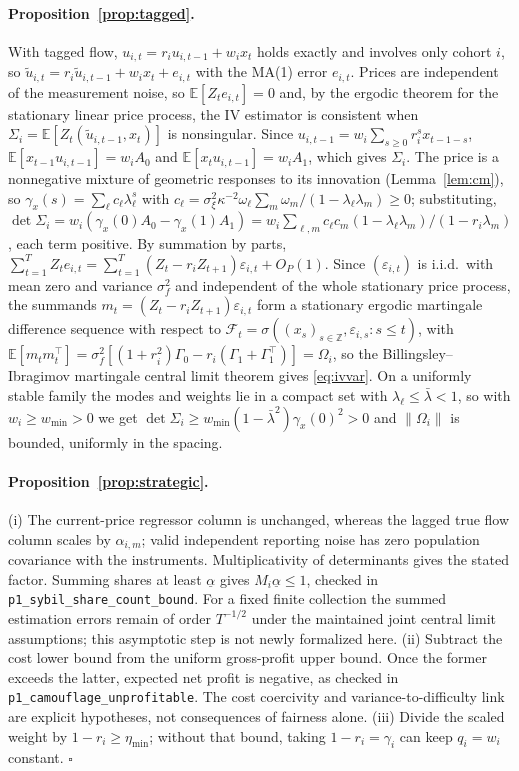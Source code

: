 \documentclass[12pt]{article}
\theoremstyle{definition}
\theoremstyle{remark}
\newcommand{\E}{\mathbb{E}}
\begin{document}
\paragraph{Proposition~\ref{prop:tagged}.} With tagged flow, $u_{i,t}=r_iu_{i,t-1}+w_ix_t$ holds exactly and involves only cohort $i$, so $\tilde u_{i,t}=r_i\tilde u_{i,t-1}+w_ix_t+e_{i,t}$ with the MA(1) error $e_{i,t}$. Prices are independent of the measurement noise, so $\E[Z_te_{i,t}]=0$ and, by the ergodic theorem for the stationary linear price process, the IV estimator is consistent when $\Sigma_i=\E[Z_t(\tilde u_{i,t-1},x_t)]$ is nonsingular. Since $u_{i,t-1}=w_i\sum_{s\ge0}r_i^sx_{t-1-s}$, $\E[x_{t-1}u_{i,t-1}]=w_iA_0$ and $\E[x_tu_{i,t-1}]=w_iA_1$, which gives $\Sigma_i$. The price is a nonnegative mixture of geometric responses to its innovation (Lemma~\ref{lem:cm}), so $\gamma_x(s)=\sum_\ell c_\ell\lambda_\ell^{s}$ with $c_\ell=\sigma_\xi^2\kappa^{-2}\omega_\ell\sum_m\omega_m/(1-\lambda_\ell\lambda_m)\ge0$; substituting, $\det\Sigma_i=w_i(\gamma_x(0)A_0-\gamma_x(1)A_1)=w_i\sum_{\ell,m}c_\ell c_m(1-\lambda_\ell\lambda_m)/(1-r_i\lambda_m)$, each term positive. By summation by parts, $\sum_{t=1}^TZ_te_{i,t}=\sum_{t=1}^T(Z_t-r_iZ_{t+1})\varepsilon_{i,t}+O_P(1)$. Since $(\varepsilon_{i,t})$ is i.i.d.\ with mean zero and variance $\sigma_f^2$ and independent of the whole stationary price process, the summands $m_t=(Z_t-r_iZ_{t+1})\varepsilon_{i,t}$ form a stationary ergodic martingale difference sequence with respect to $\mathcal F_t=\sigma((x_s)_{s\in\mathbb Z},\varepsilon_{i,s}:s\le t)$, with $\E[m_tm_t^\top]=\sigma_f^2[(1+r_i^2)\Gamma_0-r_i(\Gamma_1+\Gamma_1^\top)]=\Omega_i$, so the Billingsley--Ibragimov martingale central limit theorem gives \eqref{eq:ivvar}. On a uniformly stable family the modes and weights lie in a compact set with $\lambda_\ell\le\bar\lambda<1$, so with $w_i\ge w_{\min}>0$ we get $\det\Sigma_i\ge w_{\min}(1-\bar\lambda^2)\gamma_x(0)^2>0$ and $\|\Omega_i\|$ is bounded, uniformly in the spacing.

\paragraph{Proposition~\ref{prop:strategic}.} (i) The current-price regressor column is unchanged, whereas the lagged true flow column scales by $\alpha_{i,m}$; valid independent reporting noise has zero population covariance with the instruments. Multiplicativity of determinants gives the stated factor. Summing shares at least $\underline\alpha$ gives $M_i\underline\alpha\le1$, checked in \nolinkurl{p1_sybil_share_count_bound}. For a fixed finite collection the summed estimation errors remain of order $T^{-1/2}$ under the maintained joint central limit assumptions; this asymptotic step is not newly formalized here. (ii) Subtract the cost lower bound from the uniform gross-profit upper bound. Once the former exceeds the latter, expected net profit is negative, as checked in \nolinkurl{p1_camouflage_unprofitable}. The cost coercivity and variance-to-difficulty link are explicit hypotheses, not consequences of fairness alone. (iii) Divide the scaled weight by $1-r_i\ge\eta_{\min}$; without that bound, taking $1-r_i=\gamma_i$ can keep $q_i=w_i$ constant. $\square$
\end{document}
